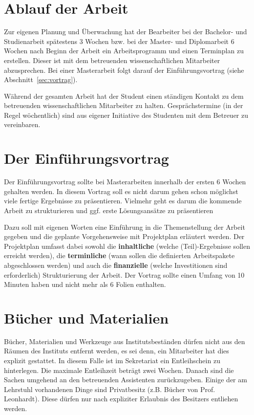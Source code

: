 \section{Ablauf der Arbeit}
Zur eigenen Planung und Überwachung hat der Bearbeiter bei der Bachelor- und Studienarbeit spätestens 3 Wochen
bzw. bei der Master- und Diplomarbeit 6 Wochen nach Beginn der Arbeit ein Arbeitsprogramm und einen Terminplan
zu erstellen. Dieser ist mit dem betreuenden wissenschaftlichen Mitarbeiter abzusprechen. Bei einer
Masterarbeit folgt darauf der Einführungsvortrag (siehe Abschnitt~\ref{sec:vortrag}).

Während der gesamten Arbeit hat der Student einen ständigen Kontakt zu dem betreuenden wissenschaftlichen Mitarbeiter zu halten. Gesprächstermine (in der Regel wöchentlich) sind aus eigener Initiative des Studenten mit dem Betreuer zu vereinbaren.

\section{Der Einführungsvortrag\label{sec:vortrag}}
Der Einführungsvortrag sollte bei Masterarbeiten innerhalb der ersten 6 Wochen gehalten werden. 
In diesem Vortrag soll es nicht darum gehen schon möglichst viele fertige Ergebnisse zu präsentieren. Vielmehr geht es darum die kommende Arbeit zu strukturieren und ggf. erste Lösungsansätze zu präsentieren

Dazu soll mit eigenen Worten eine Einführung in die Themenstellung der Arbeit gegeben und die geplante Vorgehensweise mit Projektplan erläutert werden. Der Projektplan umfasst dabei
sowohl die \textbf{inhaltliche} (welche (Teil)-Ergebnisse sollen erreicht werden), die
\textbf{terminliche} (wann sollen die definierten Arbeitspakete abgeschlossen werden) und auch die
\textbf{finanzielle} (welche Investitionen sind erforderlich) Strukturierung der Arbeit. Der
Vortrag sollte einen Umfang von 10 Minuten haben und nicht mehr als 6 Folien enthalten.

\section{Bücher und Materialien}
Bücher, Materialien und Werkzeuge aus Institutsbeständen dürfen nicht aus den Räumen des Instituts entfernt werden, es sei
denn, ein Mitarbeiter hat dies explizit gestattet. In diesem Falle ist im  Sekretariat ein
Entleihschein zu hinterlegen. Die maximale Entleihzeit beträgt zwei Wochen. Danach sind die Sachen
umgehend an den betreuenden Assistenten zurückzugeben. Einige der am Lehrstuhl vorhandenen Dinge sind Privatbesitz (z.B. Bücher von Prof. Leonhardt). Diese dürfen nur nach expliziter Erlaubnis des Besitzers entliehen werden.

